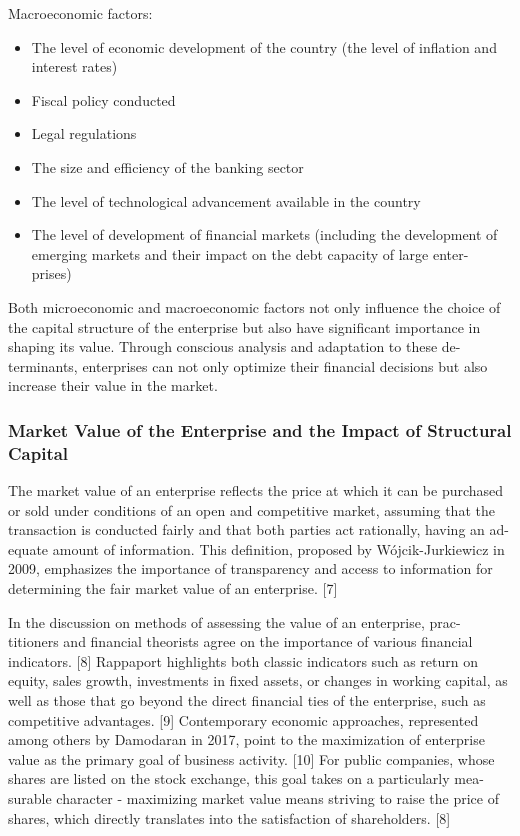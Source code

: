 \documentclass{article}
\begin{document}
\begin{flushleft}
\begin{justify}
Macroeconomic factors:
\begin{itemize}
\item{The level of economic development of the country (the level of inflation
and interest rates)}
\item{Fiscal policy conducted}
\item{Legal regulations}
\item{The size and efficiency of the banking sector}
\item{The level of technological advancement available in the country}
\item{The level of development of financial markets (including the development
of emerging markets and their impact on the debt capacity of large enter-
prises)}
\end{itemize}

Both microeconomic and macroeconomic factors not only influence the choice
of the capital structure of the enterprise but also have significant importance
in shaping its value. Through conscious analysis and adaptation to these de-
terminants, enterprises can not only optimize their financial decisions but also
increase their value in the market.


\subsubsection{Market Value of the Enterprise and the Impact of Structural Capital}

The market value of an enterprise reflects the price at which it can be purchased
or sold under conditions of an open and competitive market, assuming that the
transaction is conducted fairly and that both parties act rationally, having an ad-
equate amount of information. This definition, proposed by Wójcik-Jurkiewicz
in 2009, emphasizes the importance of transparency and access to information
for determining the fair market value of an enterprise. [7]

In the discussion on methods of assessing the value of an enterprise, prac-
titioners and financial theorists agree on the importance of various financial
indicators. [8] Rappaport highlights both classic indicators such as return on
equity, sales growth, investments in fixed assets, or changes in working capital,
as well as those that go beyond the direct financial ties of the enterprise, such
as competitive advantages. [9] Contemporary economic approaches, represented
among others by Damodaran in 2017, point to the maximization of enterprise
value as the primary goal of business activity. [10] For public companies, whose
shares are listed on the stock exchange, this goal takes on a particularly mea-
surable character - maximizing market value means striving to raise the price
of shares, which directly translates into the satisfaction of shareholders. [8]


\end{justify}
\end{flushleft}
\end{document}
